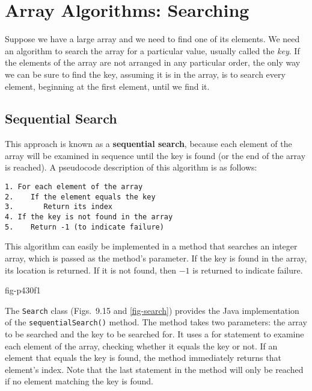\section{Array Algorithms: Searching}
\label{array-algorithms-searching}
\noindent Suppose we have a large array and we need to find one of its
elements.  We need an algorithm to search the array for a particular
value, usually called the {\it key}. If the elements of the array are
not arranged in any particular order, the only way we can be sure to
find the key, assuming it is in the array, is to search every element,
beginning at the first element, until we find it.


\subsection{Sequential Search}
\noindent This approach is known as a {\bf sequential
search}, because each element of the array will be examined in
sequence until the key is found (or the end of the array is
reached). A pseudocode description of this algorithm is as follows:

\begin{jjjlisting}
\begin{lstlisting}
1. For each element of the array
2.    If the element equals the key
3.       Return its index
4. If the key is not found in the array
5.    Return -1 (to indicate failure)
\end{lstlisting}
\end{jjjlisting}

This algorithm can easily be implemented in a method that searches an
integer array, which is passed as the method's parameter.  If the key
is found in the array, its location is returned.  If it is not found,
then $-1$ is returned to indicate failure.

{fig-p430f1}


The {\tt Search} class (Figs.~9.15 and \ref{fig-search})
provides the Java implementation of the {\tt sequentialSearch()} method.
The method takes two parameters: the array to be searched and the key
to be searched for.  It uses a for statement to examine each element
of the array, checking whether it equals the key or not.  If an
element that equals the key is found, the method immediately returns
that element's index.  Note that the last statement in the method will
only be reached if no element matching the key is found.

